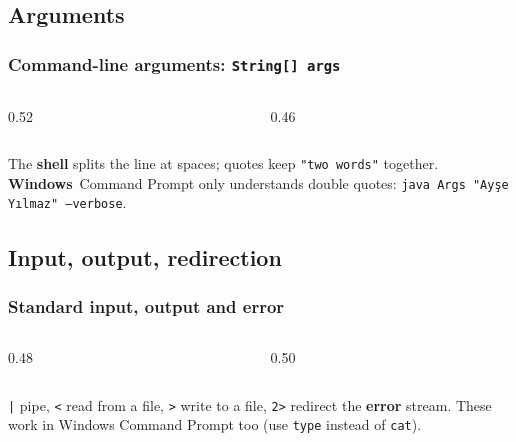 \documentclass[aspectratio=169,10pt,compress]{beamer}
\newcommand{\win}{\textbf{Windows}}
\begin{document}
\subsection[Arguments]{Arguments}




\begin{frame}[t,fragile] \frametitle{Command-line arguments: \texttt{String[] args}}
  \begin{columns}[T]
    \begin{column}{0.52\textwidth}
    \end{column}
    \begin{column}{0.46\textwidth}
    \end{column}
  \end{columns}

  \vspace{0.1em}
  \small The \textbf{shell} splits the line at spaces; quotes keep \texttt{"two words"} together. \win\ Command Prompt
  only understands double quotes: \texttt{java Args "Ayşe Yılmaz" --verbose}.
\end{frame}

\subsection[Streams]{Input, output, redirection}




\begin{frame}[t,fragile] \frametitle{Standard input, output and error}
  \begin{columns}[T]
    \begin{column}{0.48\textwidth}
    \end{column}
    \begin{column}{0.50\textwidth}
    \end{column}
  \end{columns}

  \vspace{0.1em}
  \small \texttt{|} pipe, \texttt{<} read from a file, \texttt{>} write to a file, \texttt{2>} redirect the \textbf{error} stream.
  These work in Windows Command Prompt too (use \texttt{type} instead of \texttt{cat}).
\end{frame}
\end{document}
